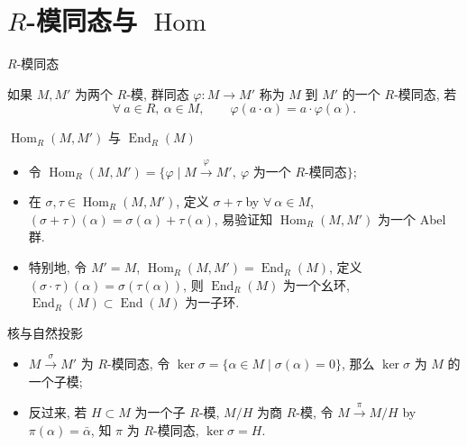 
\section[模同态]{$R$-模同态与 $\operatorname{Hom}$}


\begin{frame}{$R$-模同态}

\begin{Def}[$R$-模同态]
如果 $M, M'$ 为两个 $R$-模, 群同态 $\varphi: M \to M'$
称为 $M$ 到 $M'$ 的一个 $R$-模同态, 若
\[
\forall\ a \in R,\ \alpha \in M, \qquad
\varphi(a \cdot \alpha) = a \cdot \varphi(\alpha).
\]
\end{Def}

\end{frame}


\begin{frame}{$\operatorname{Hom}_R(M, M')$ 与 $\operatorname{End}_R(M)$}

\begin{itemize}
\item 令 $\operatorname{Hom}_R(M, M') = \big\{ \varphi \;\big|\; M \xrightarrow{\ \varphi\ } M',\
\varphi \text{ 为一个 } R\text{-模同态} \big\}$;
\item 在 $\sigma, \tau \in \operatorname{Hom}_R(M, M')$, 定义 $\sigma + \tau$ by
  $\forall\ \alpha \in M$, $(\sigma + \tau)(\alpha) = \sigma(\alpha) + \tau(\alpha)$,
  易验证知 $\operatorname{Hom}_R(M, M')$ 为一个 Abel 群.
\end{itemize}

\pause

\begin{itemize}
\item 特别地, 令 $M' = M$, $\operatorname{Hom}_R(M, M') = \operatorname{End}_R(M)$,
  定义 $(\sigma \cdot \tau)(\alpha) = \sigma(\tau(\alpha))$,
  则 $\operatorname{End}_R(M)$ 为一个幺环,
  $\operatorname{End}_R(M) \subset \operatorname{End}(M)$ 为一子环.
\end{itemize}

\end{frame}


\begin{frame}{核与自然投影}

\begin{itemize}
\item $M \xrightarrow{\ \sigma\ } M'$ 为 $R$-模同态, 令
  $\ker \sigma = \big\{ \alpha \in M \;\big|\; \sigma(\alpha) = 0 \big\}$,
  那么 $\ker \sigma$ 为 $M$ 的一个子模;
\item 反过来, 若 $H \subset M$ 为一个子 $R$-模, $M/H$ 为商 $R$-模,
  令 $M \xrightarrow{\ \pi\ } M/H$ by $\pi(\alpha) = \bar{\alpha}$,
  知 $\pi$ 为 $R$-模同态, $\ker \sigma = H$.
\end{itemize}

\end{frame}

